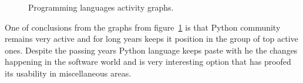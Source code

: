 \begin{figure}[ht]
  \begin{center}
  \end{center}
  \caption{Programming languages activity graphs.}
  \label{fig:ohloh_lang_graph}
\end{figure}
One of conclusions from the graphs from figure~\ref{fig:ohloh_lang_graph} is that Python community remains very active and for long years keeps it position in the group of top active ones. Despite the passing years Python language keeps paste with he the changes happening in the software world and is very interesting option that has proofed its usability in miscellaneous areas.  

